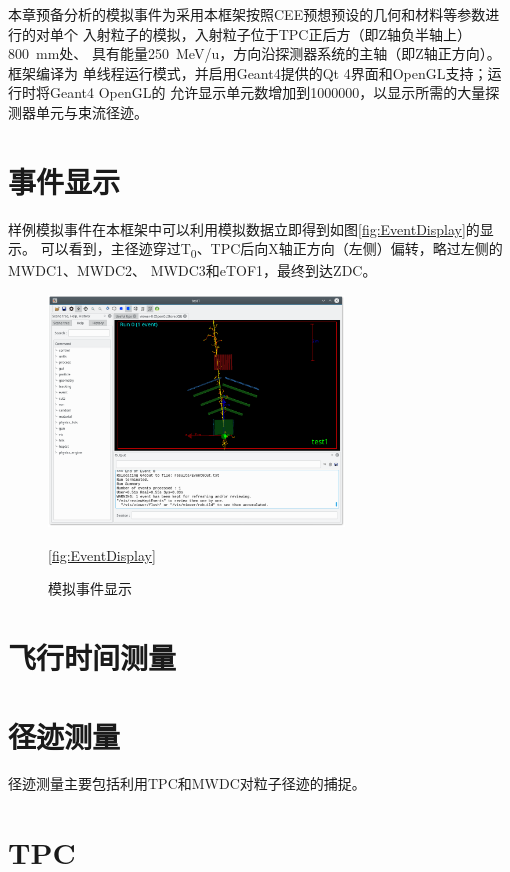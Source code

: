 \documentclass[bachelor,openany,oneside,color]{buaathesis}
\def\TZ{T\textsubscript{0}}
\begin{document}
本章预备分析的模拟事件为采用本框架按照CEE预想预设的几何和材料等参数进行的对单个
入射粒子的模拟，入射粒子位于TPC正后方（即Z轴负半轴上）\SI{800}{\milli\meter}处、
具有能量\SI{250}{\mega\eV/u}，方向沿探测器系统的主轴（即Z轴正方向）。框架编译为
单线程运行模式，并启用Geant4提供的Qt 4界面和OpenGL支持；运行时将Geant4 OpenGL的
允许显示单元数增加到1000000，以显示所需的大量探测器单元与束流径迹。

\section{事件显示}

样例模拟事件在本框架中可以利用模拟数据立即得到如图\ref{fig:EventDisplay}的显示。
可以看到，主径迹穿过\TZ、TPC后向X轴正方向（左侧）偏转，略过左侧的MWDC1、MWDC2、
MWDC3和eTOF1，最终到达ZDC。

\begin{figure}
	\centering
	\includegraphics[width=0.7\textwidth]{./resource/EventDisplay.png}
	\caption{模拟事件显示}\ref{fig:EventDisplay}
\end{figure}

\section{飞行时间测量}%

\section{径迹测量}

径迹测量主要包括利用TPC和MWDC对粒子径迹的捕捉。

\section{TPC}
\end{document}
